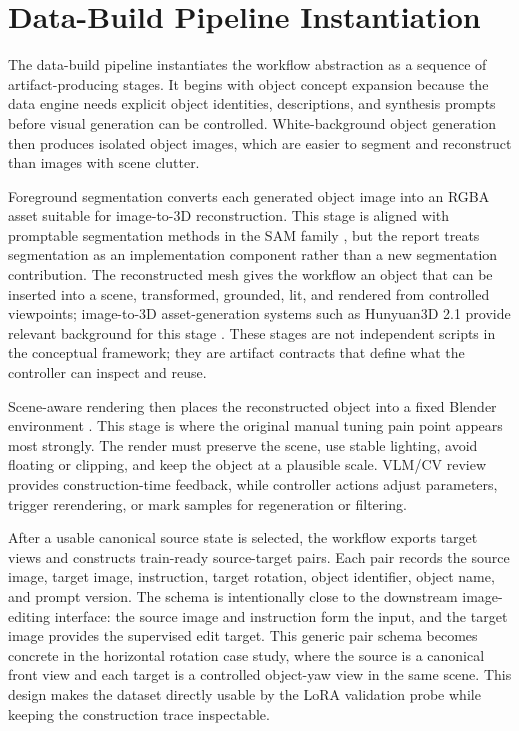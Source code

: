 \section{Data-Build Pipeline Instantiation}
\label{sec:pipeline}

The data-build pipeline instantiates the workflow abstraction as a sequence of artifact-producing stages. It begins with object concept expansion because the data engine needs explicit object identities, descriptions, and synthesis prompts before visual generation can be controlled. White-background object generation then produces isolated object images, which are easier to segment and reconstruct than images with scene clutter.

Foreground segmentation converts each generated object image into an RGBA asset suitable for image-to-3D reconstruction. This stage is aligned with promptable segmentation methods in the SAM family \cite{kirillov2023segmentanything,ravi2024sam2}, but the report treats segmentation as an implementation component rather than a new segmentation contribution. The reconstructed mesh gives the workflow an object that can be inserted into a scene, transformed, grounded, lit, and rendered from controlled viewpoints; image-to-3D asset-generation systems such as Hunyuan3D 2.1 provide relevant background for this stage \cite{teamhunyuan3d2025hunyuan3d21}. These stages are not independent scripts in the conceptual framework; they are artifact contracts that define what the controller can inspect and reuse.

Scene-aware rendering then places the reconstructed object into a fixed Blender environment \cite{blenderFoundationBlender}. This stage is where the original manual tuning pain point appears most strongly. The render must preserve the scene, use stable lighting, avoid floating or clipping, and keep the object at a plausible scale. VLM/CV review provides construction-time feedback, while controller actions adjust parameters, trigger rerendering, or mark samples for regeneration or filtering.

After a usable canonical source state is selected, the workflow exports target views and constructs train-ready source-target pairs. Each pair records the source image, target image, instruction, target rotation, object identifier, object name, and prompt version. The schema is intentionally close to the downstream image-editing interface: the source image and instruction form the input, and the target image provides the supervised edit target. This generic pair schema becomes concrete in the horizontal rotation case study, where the source is a canonical front view and each target is a controlled object-yaw view in the same scene. This design makes the dataset directly usable by the LoRA validation probe while keeping the construction trace inspectable.

